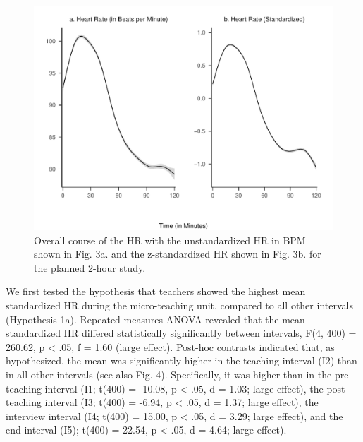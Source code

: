 \documentclass[preprint, 3p,
authoryear]{elsarticle} %
\begin{document}
\begin{figure}[htbp]
  \centering
  \includegraphics[width=1\textwidth]{plots_publication/loess_plot_std_unstd_new.pdf}
  \caption{Overall course of the HR with the unstandardized HR in BPM shown in Fig. 3a. and the z-standardized HR shown in Fig. 3b. for the planned 2-hour study.}
  \label{Overall course of the HR with the unstandardized HR in BPM shown in Fig. 3a. and the z-standardized HR shown in Fig. 3b. for the planned 2-hour study.}
\end{figure}

We first tested the hypothesis that teachers showed the highest mean
standardized HR during the micro-teaching unit, compared to all other
intervals (Hypothesis 1a). Repeated measures ANOVA revealed that the
mean standardized HR differed statistically significantly between
intervals, F(4, 400) = 260.62, p \textless{} .05, f = 1.60 (large
effect). Post-hoc contrasts indicated that, as hypothesized, the mean
was significantly higher in the teaching interval (I2) than in all other
intervals (see also Fig. 4). Specifically, it was higher than in the
pre-teaching interval (I1; t(400) = -10.08, p \textless{} .05, d = 1.03;
large effect), the post-teaching interval (I3; t(400) = -6.94, p
\textless{} .05, d = 1.37; large effect), the interview interval (I4;
t(400) = 15.00, p \textless{} .05, d = 3.29; large effect), and the end
interval (I5); t(400) = 22.54, p \textless{} .05, d = 4.64; large
effect).
\end{document}
